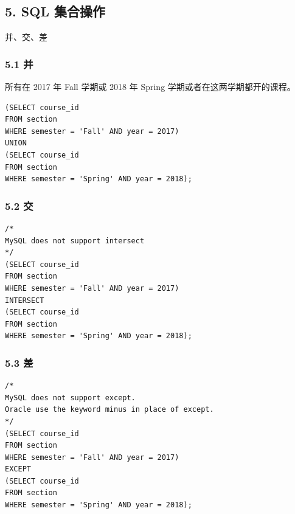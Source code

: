 \documentclass[aspectratio=169, 14pt]{beamer}
\begin{document}
\begin{frame}
    \section{\textcolor{darkmidnightblue}{5. SQL 集合操作}}  
并、交、差    
\end{frame}

\begin{frame}[fragile]
    \frametitle{5.1 并}
所有在 2017 年 Fall 学期或 2018 年 Spring 学期或者在这两学期都开的课程。

\begin{verbatim}
(SELECT course_id
FROM section
WHERE semester = 'Fall' AND year = 2017)
UNION
(SELECT course_id
FROM section
WHERE semester = 'Spring' AND year = 2018);
\end{verbatim}
    
\end{frame}

\begin{frame}[fragile]
\frametitle{5.2 交}
    \begin{verbatim}
/*
MySQL does not support intersect
*/
(SELECT course_id
FROM section
WHERE semester = 'Fall' AND year = 2017)
INTERSECT
(SELECT course_id
FROM section
WHERE semester = 'Spring' AND year = 2018);
    \end{verbatim} 

\end{frame}

\begin{frame}[fragile]
    \frametitle{5.3 差}

    \begin{verbatim}
/*
MySQL does not support except.
Oracle use the keyword minus in place of except.
*/
(SELECT course_id
FROM section
WHERE semester = 'Fall' AND year = 2017)
EXCEPT
(SELECT course_id
FROM section
WHERE semester = 'Spring' AND year = 2018);
    \end{verbatim}     

\end{frame}

\end{document}
